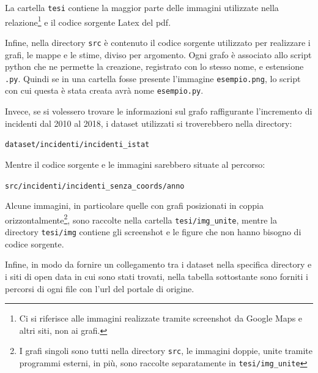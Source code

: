 \documentclass[a4paper,12pt]{report}
\newcommand{\columnstyle}[1]{\texttt{#1}}
\newcommand{\filenamestyle}[1]{\texttt{#1}}
\newcommand{\skipline}{\vspace{0.2in}}
\begin{document}
La cartella \columnstyle{tesi} contiene la maggior parte delle immagini utilizzate 
nella relazione\footnote{Ci si riferisce alle immagini realizzate tramite screenshot 
da Google Maps e altri siti, non ai grafi.} 
e il codice sorgente Latex del pdf.

Infine, nella directory \filenamestyle{src} è contenuto il codice sorgente utilizzato per realizzare 
i grafi, le mappe e le stime, diviso per argomento. 
Ogni grafo è associato allo script python che ne permette la creazione, registrato con 
lo stesso nome, e estensione \filenamestyle{.py}. 
Quindi se in una cartella fosse presente l'immagine \filenamestyle{esempio.png}, lo script con 
cui questa è stata creata avrà nome \filenamestyle{esempio.py}.

Invece, se si volessero trovare le informazioni sul grafo raffigurante 
l'incremento di incidenti 
dal 2010 al 2018, i dataset utilizzati si troverebbero nella directory:

\skipline
\indent\filenamestyle{dataset/incidenti/incidenti\_istat}

\skipline
\noindent Mentre il codice sorgente e le immagini sarebbero situate al percorso:

\skipline
\indent\filenamestyle{src/incidenti/incidenti\_senza\_coords/anno}

\skipline

Alcune immagini, in particolare quelle con grafi posizionati in coppia 
orizzontalmente\footnote{I grafi singoli sono tutti nella directory \filenamestyle{src}, 
le immagini doppie, unite tramite programmi esterni, in più, sono raccolte separatamente 
in \filenamestyle{tesi/img\_unite}}, sono raccolte nella 
cartella \filenamestyle{tesi/img\_unite}, 
mentre la directory \filenamestyle{tesi/img} contiene gli screenshot e le 
figure che non hanno bisogno di codice sorgente.

Infine, in modo da fornire un collegamento tra i dataset nella specifica directory e i siti 
di open data in cui sono stati trovati, nella tabella sottostante sono forniti i percorsi di 
ogni file con l'url del portale di origine.
\end{document}

